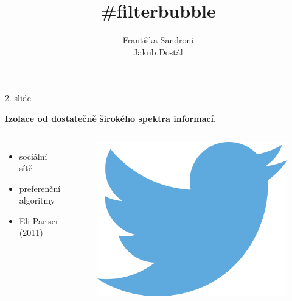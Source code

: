 \documentclass[notheorems,12pt]{beamer}
\title[]{\#filterbubble}
\date{}
\author{Františka Sandroni\\
        Jakub Dostál}
\institute{}
\begin{document}
\maketitle
\begin{frame}{2. slide}
    \center
    \vspace{-0.1cm}
    \begin{large}\textbf{Izolace od dostatečně širokého spektra informací.}\end{large}
    \vspace{0.8cm}
    \begin{columns}
    \column{5cm}
    \begin{itemize}
        \item sociální sítě
        \item preferenční algoritmy
        \item Eli Pariser (2011)
    \end{itemize}
    \column{6cm}
        \begin{figure}
            \centering
            \includegraphics[scale=0.4]{./Pics/twitter.png}
        \end{figure}
    \end{columns}
\end{frame}
\end{document}
